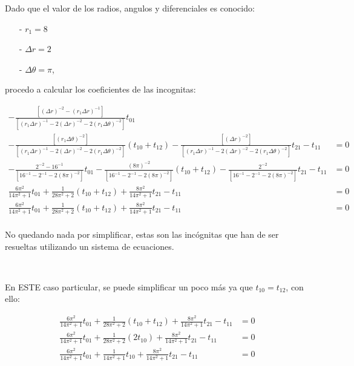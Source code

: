 \documentclass{article}
\begin{document}
\newpage

\noindent Dado que el valor de los radios, angulos y diferenciales es conocido: 

\begin{itemize}
    \item[-] $r_1 = 8$
    \item[-] $\Delta r = 2$ 
    \item[-] $\Delta\theta = \pi$,
\end{itemize}

procedo a calcular los coeficientes de las incognitas:

\begin{align*}
    -\frac{[{(\Delta r)}^{-2} - {(r_1\Delta r)}^{-1}]}{[{(r_1\Delta r)}^{-1} - 2{(\Delta r)}^{-2} - 2{(r_{1}\Delta \theta)}^{-2}]}t_{01}
    & \\
    -\frac{[{(r_{1}\Delta \theta)}^{-2}]}{[{(r_1\Delta r)}^{-1} - 2{(\Delta r)}^{-2} - 2{(r_{1}\Delta \theta)}^{-2}]}(t_{10} + t_{12})
    -\frac{[{(\Delta r)}^{-2}]}{[{(r_1\Delta r)}^{-1} - 2{(\Delta r)}^{-2} - 2{(r_{1}\Delta \theta)}^{-2}]}t_{21} - t_{11} &= 0 \\
    -\frac{2^{-2} - 16^{-1}}{[16^{-1} - 2^{-1} - 2{(8\pi)}^{-2}]}t_{01}
    -\frac{{(8\pi)}^{-2}}{[16^{-1} - 2^{-1} - 2{(8\pi)}^{-2}]}(t_{10} + t_{12})
    -\frac{2^{-2}}{[16^{-1} - 2^{-1} - 2{(8\pi)}^{-2}]}t_{21} - t_{11} &= 0 \\
    \frac{6\pi^2}{14\pi^2 + 1}t_{01}
    +\frac{1}{28\pi^2 + 2}(t_{10} + t_{12})
    +\frac{8\pi^2}{14\pi^2 + 1}t_{21} - t_{11} &= 0 \\
    \frac{6\pi^2}{14\pi^2 + 1}t_{01}
    +\frac{1}{28\pi^2 + 2}(t_{10} + t_{12})
    +\frac{8\pi^2}{14\pi^2 + 1}t_{21} - t_{11} &= 0 \\
\end{align*}

\noindent No quedando nada por simplificar, estas son las incógnitas que han de ser resueltas utilizando un sistema de ecuaciones.

\

En ESTE caso particular, se puede simplificar un poco más ya que $t_{10} = t_{12}$, con ello:


\begin{align*}
    \frac{6\pi^2}{14\pi^2 + 1}t_{01}
    +\frac{1}{28\pi^2 + 2}(t_{10} + t_{12})
    +\frac{8\pi^2}{14\pi^2 + 1}t_{21} - t_{11} &= 0 \\
    \frac{6\pi^2}{14\pi^2 + 1}t_{01}
    +\frac{1}{28\pi^2 + 2}(2t_{10})
    +\frac{8\pi^2}{14\pi^2 + 1}t_{21} - t_{11} &= 0 \\
    \frac{6\pi^2}{14\pi^2 + 1}t_{01}
    +\frac{1}{14\pi^2 + 1}t_{10}
    +\frac{8\pi^2}{14\pi^2 + 1}t_{21} - t_{11} &= 0 \\
\end{align*}
\end{document}
